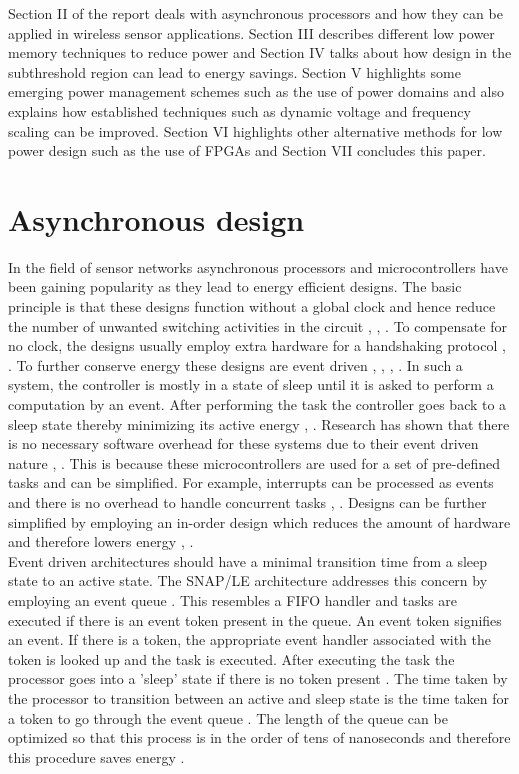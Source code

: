 \documentclass[journal]{IEEEtran}
\begin{document}
Section II of the report deals with asynchronous processors and how they can be applied in wireless sensor applications. Section III describes different low power memory techniques to reduce power and Section IV talks about how design in the subthreshold region can lead to energy savings. Section V highlights some emerging power management schemes such as the use of power domains and also explains how established techniques such as dynamic voltage and frequency scaling can be improved. Section VI highlights other alternative methods for low power design such as the use of FPGAs and Section VII concludes this paper.

\section{Asynchronous design}
In the field of sensor networks asynchronous processors and microcontrollers have been gaining popularity as they lead to energy efficient designs. The basic principle is that these designs function without a global clock and hence reduce the number of unwanted switching activities in the circuit \cite{SNAP/LE}, \cite{LowPower2005}, \cite{FPGAEvent}. To compensate for no clock, the designs usually employ extra hardware for a handshaking protocol \cite{SNAP/LE}, \cite{FPGAEvent}. To further conserve energy these designs are event driven \cite{SNAP/LE}, \cite{LowPower2005}, \cite{FPGAEvent}, \cite{AVR}. In such a system, the controller is mostly in a state of sleep until it is asked to perform a computation by an event. After performing the task the controller goes back to a sleep state thereby minimizing its active energy \cite{SNAP/LE}, \cite{LowPower2005}. Research has shown that there is no necessary software overhead for these systems due to their event driven nature \cite{SNAP/LE}, \cite{LowPower2005}. This is because these microcontrollers are used for a set of pre-defined tasks and can be simplified. For example, interrupts can be processed as events and there is no overhead to handle concurrent tasks \cite{SNAP/LE}, \cite{LowPower2005}. Designs can be further simplified by employing an in-order design which reduces the amount of hardware and therefore lowers energy \cite{LowPower2005}, \cite{SmartDust}. \\

Event driven architectures should have a minimal transition time from a sleep state to an active state. The SNAP/LE architecture addresses this concern by employing an event queue \cite{SNAP/LE}. This resembles a FIFO handler and tasks are executed if there is an event token present in the queue. An event token signifies an event. If there is a token, the appropriate event handler associated with the token is looked up and the task is executed. After executing the task the processor goes into a 'sleep' state if there is no token present \cite{SNAP/LE}. The time taken by the processor to transition between an active and sleep state is the time taken for a token to go through the event queue \cite{SNAP/LE}. The length of the queue can be optimized so that this process is in the order of tens of nanoseconds and therefore this procedure saves energy \cite{SNAP/LE}. \\
\end{document}
